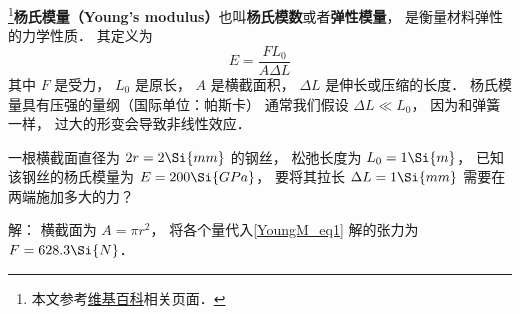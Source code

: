 
\begin{issues}
\issueDraft
\end{issues}

\footnote{本文参考\href{https://en.wikipedia.org/wiki/Young's_modulus}{维基百科}相关页面．}\textbf{杨氏模量（Young's modulus）}也叫\textbf{杨氏模数}或者\textbf{弹性模量}， 是衡量材料弹性的力学性质． 其定义为
\begin{equation}\label{YoungM_eq1}
E = \frac{FL_0}{A\Delta L}
\end{equation}
其中 $F$ 是受力， $L_0$ 是原长， $A$ 是横截面积， $\Delta L$ 是伸长或压缩的长度． 杨氏模量具有压强的量纲（国际单位：帕斯卡）   通常我们假设 $\Delta L \ll L_0$， 因为和弹簧一样， 过大的形变会导致非线性效应．

\begin{example}{}
一根横截面直径为 $2r = 2\Si{mm}$ 的钢丝， 松弛长度为 $L_0 = 1\Si{m}$， 已知该钢丝的杨氏模量为 $E = 200\Si{GPa}$， 要将其拉长 $\Delta L = 1\Si{mm}$ 需要在两端施加多大的力？

解： 横截面为 $A = \pi r^2$， 将各个量代入\autoref{YoungM_eq1} 解的张力为 $F = 628.3\Si{N}$．
\end{example}
